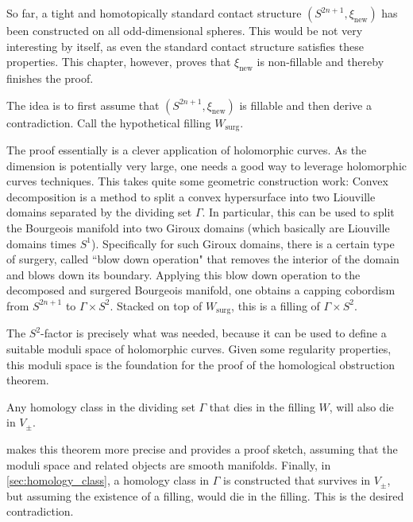 So far, a tight and homotopically standard contact structure $(S^{2n+1}, \xi_\text{new})$ has been constructed on all odd-dimensional spheres.
This would be not very interesting by itself, as even the standard contact structure satisfies these properties.
This chapter, however, proves that $\xi_\text{new}$ is non-fillable and thereby finishes the proof.

The idea is to first assume that $(S^{2n+1}, \xi_\text{new})$ is fillable and then derive a contradiction.
Call the hypothetical filling $W_\text{surg}$. 

The proof essentially is a clever application of holomorphic curves.
As the dimension is potentially very large, one needs a good way to leverage holomorphic curves techniques.
This takes quite some geometric construction work: 
Convex decomposition is a method to split a convex hypersurface into two Liouville domains separated by the dividing set $\Gamma$.
In particular, this can be used to split the Bourgeois manifold into two Giroux domains (which basically are Liouville domains times $S^1$).
Specifically for such Giroux domains, there is a certain type of surgery, called ``blow down operation" that removes the
interior of the domain and blows down its boundary.
Applying this blow down operation to the decomposed and surgered Bourgeois manifold, one obtains a
capping cobordism from $S^{2n+1}$ to $\Gamma \times S^2$.
Stacked on top of $W_\text{surg}$, this is a filling of $\Gamma \times S^2$.

The $S^2$-factor is precisely what was needed, 
because it can be used to define a suitable moduli space of holomorphic curves. 
Given some regularity properties, this moduli space is the foundation for the proof of the homological obstruction theorem.
\begin{theorem}
    Any homology class in the dividing set $\Gamma$ that dies in the filling $W$, will also die in $V_\pm$.
\end{theorem}
 makes this theorem more precise and provides a proof sketch, assuming that the moduli space and
related objects are smooth manifolds.
Finally, in \cref{sec:homology_class}, a homology class in $\Gamma$ is constructed that survives in $V_\pm$, but assuming
the existence of a filling, would die in the filling. This is the desired contradiction. 